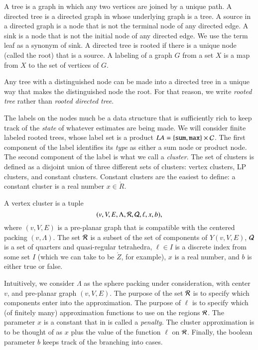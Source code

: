 
\begin{definition}
A tree is a graph in which any two vertices are joined by a unique path.
A directed tree is a directed graph in whose underlying graph is a tree.
A source in a directed graph is a node that is not the terminal node
of any directed edge.  A sink is a node that is not the initial node
of any directed edge.  We use the term leaf as a synonym of sink.
A directed tree is rooted if there is a unique node (called
the root) that is a source.
A labeling of a graph $G$ from a set $X$ is a map from $X$ to the set
of vertices of $G$.
\end{definition}

Any tree with a distinguished node can be made into a directed
tree in a unique way that makes the distinguished node the root. 
For that reason, we write {\it rooted tree} rather than
{\it rooted directed tree}.

The labels on the nodes much be a data structure that is sufficiently
rich to keep track of the {\it state} of whatever estimates are
being made.
We will consider finite labeled rooted trees, whose label set
is a product $LA=\{{\tt sum, max}\} \times {\cal C}$.   The first
component of the label identifies its {\it type} as either a sum
node or product node. 
The second component of the label is what we call a {\it cluster}.
The set of clusters is defined as a disjoint union of three different sets
of clusters:  vertex clusters, LP clusters, and constant clusters.
Constant clusters are the easiest to define: a constant cluster
is a real number $x\in\ring{R}$.  

\begin{definition}
A vertex
cluster is a tuple
    $$
    (v,V,E,\Lambda,{\cal R},{\cal Q},\ell,x,b),
    $$
where $(v,V,E)$ is a pre-planar graph that is compatible with
the centered packing $(v,\Lambda)$.  
The set ${\cal R}$ is a subset of the set of components of $Y(v,V,E)$,
${\cal Q}$ is a set of quarters and quasi-regular tetrahedra,
$\ell\in I$ is a discrete index from some set $I$ (which we can
take to be $\ring{Z}$, for example), 
$x$ is a real number, and
$b$ is either true or false.
\end{definition}

Intuitively, we consider $\Lambda$ as the sphere packing under
consideration, with center $v$, and pre-planar graph $(v,V,E)$.
The purpose of the set ${\cal R}$ is to specify which components
enter into the approximation.  The purpose of $\ell$ is to specify
which (of finitely many) approximation functions to use on the
regions ${\cal R}$.  The parameter $x$ is a constant that in \cite{DCG}
is called a {\it penalty}.  The cluster approximation is to be
thought of as $x$ plus the value of the function $\ell$ on ${\cal R}$.
Finally, the boolean parameter $b$ keeps track of the branching into
cases.

